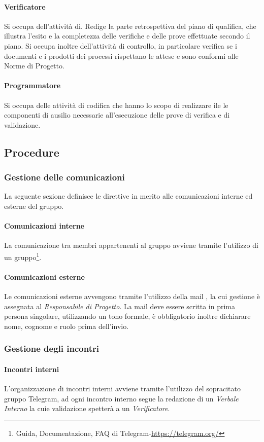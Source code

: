 \paragraph{Verificatore} Si occupa dell'attività di. Redige la parte retrospettiva del piano di qualifica, che illustra l'esito e la completezza delle verifiche e delle prove effettuate secondo il piano. Si occupa  inoltre dell'attività di controllo, in particolare verifica se i documenti e i prodotti dei processi rispettano le attese e sono conformi alle Norme di Progetto.
\paragraph{Programmatore} Si occupa delle attività di codifica che hanno lo scopo di realizzare ile le componenti di ausilio necessarie all'esecuzione delle prove di verifica e di validazione. 
\subsection{Procedure}
\subsubsection{Gestione delle comunicazioni}
La seguente sezione definisce le direttive in merito alle comunicazioni interne ed esterne del gruppo.
\paragraph{Comunicazioni interne}
La comunicazione tra membri appartenenti al gruppo avviene tramite l'utilizzo di un gruppo\footnote{Guida, Documentazione, FAQ di Telegram-\url{https://telegram.org/}}.
\paragraph{Comunicazioni esterne}
Le comunicazioni esterne avvengono tramite l'utilizzo della mail \mailzeroseven, la cui gestione è assegnata al \textit{Responsabile di Progetto}.
La mail deve essere scritta in prima persona singolare, utilizzando un tono formale, è obbligatorio inoltre dichiarare nome, cognome e ruolo prima dell'invio.
\subsubsection{Gestione degli incontri}
\paragraph{Incontri interni} L'organizzazione di incontri interni avviene tramite l'utilizzo del sopracitato gruppo Telegram, ad ogni incontro interno segue la redazione di un \textit{Verbale Interno} la cuie validazione spetterà a un \textit{Verificatore}.
